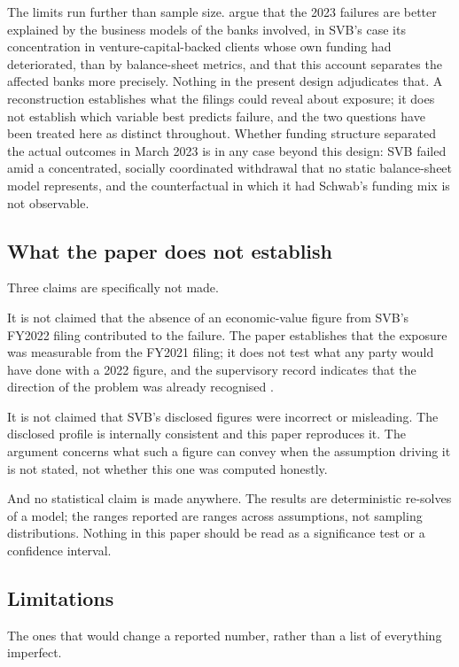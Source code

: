 The limits run further than sample size. \citet{KellyRose2025} argue that the 2023
failures are better explained by the business models of the banks involved, in SVB's
case its concentration in venture-capital-backed clients whose own funding had
deteriorated, than by balance-sheet metrics, and that this account separates the
affected banks more precisely. Nothing in the present design adjudicates that. A
reconstruction establishes what the filings could reveal about exposure; it does not
establish which variable best predicts failure, and the two questions have been
treated here as distinct throughout. Whether funding structure separated the actual
outcomes in March 2023 is in any case beyond this design: SVB failed amid a
concentrated, socially coordinated withdrawal that no static balance-sheet model
represents, and the counterfactual in which it had Schwab's funding mix is not
observable.

\subsection{What the paper does not establish}

Three claims are specifically not made.

It is not claimed that the absence of an economic-value figure from SVB's FY2022
filing contributed to the failure. The paper establishes that the exposure was
measurable from the FY2021 filing; it does not test what any party would have done
with a 2022 figure, and the supervisory record indicates that the direction of the
problem was already recognised \citep{FRB2023}.

It is not claimed that SVB's disclosed figures were incorrect or misleading. The
disclosed profile is internally consistent and this paper reproduces it. The argument
concerns what such a figure can convey when the assumption driving it is not stated,
not whether this one was computed honestly.

And no statistical claim is made anywhere. The results are deterministic re-solves of
a model; the ranges reported are ranges across assumptions, not sampling
distributions. Nothing in this paper should be read as a significance test or a
confidence interval.

\subsection{Limitations}

The ones that would change a reported number, rather than a list of everything
imperfect.

